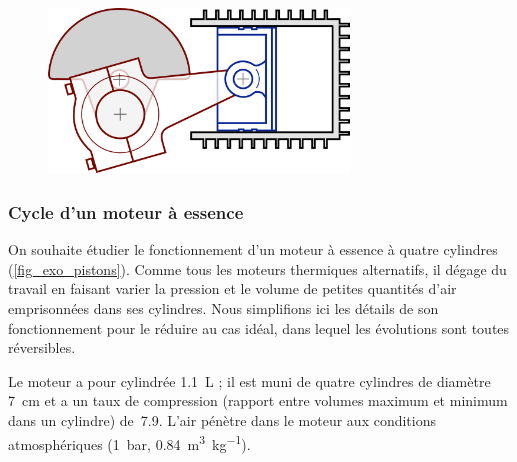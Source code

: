 	\begin{figure}[h!]
	\begin{center}
		\includegraphics[width=8cm]{images/compresseur_air.png}
	\end{center}
	\label{fig_compresseur}
	\end{figure}

\subsubsection{Cycle d’un moteur à essence}
\label{exo_cycle_moteur_essence}

	On souhaite étudier le fonctionnement d’un moteur à essence à quatre cylindres (\cref{fig_exo_pistons}). Comme tous les moteurs thermiques alternatifs, il dégage du travail en faisant varier la pression et le volume de petites quantités d’air emprisonnées dans ses cylindres. Nous simplifions ici les détails de son fonctionnement pour le réduire au cas idéal, dans lequel les évolutions sont toutes réversibles.
	
	Le moteur a pour cylindrée \SI{1,1}{\liter} ; il est muni de quatre cylindres de diamètre \SI{7}{\centi\metre} et a un taux de compression (rapport entre volumes maximum et minimum dans un cylindre) de~\num{7,9}. L’air pénètre dans le moteur aux conditions atmosphériques (\SI{1}{\bar}, \SI{0,84}{\metre\cubed\per\kilogram}).
	
